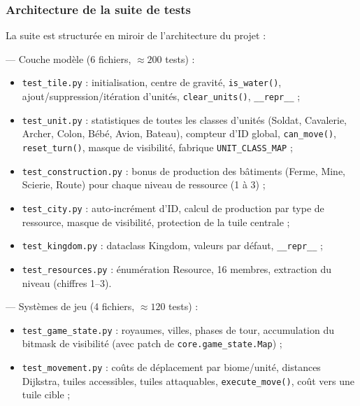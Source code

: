 \documentclass[12pt, a4paper]{article}
\begin{document}
\subsubsection{Architecture de la suite de tests}

La suite est structurée en miroir de l'architecture du projet :

\begin{description}[leftmargin=2em]
    \item[\texttt{test/world/}] — Couche modèle (6 fichiers, $\approx 200$ tests) :
    \begin{itemize}
        \item \texttt{test\_tile.py} : initialisation, centre de gravité, \texttt{is\_water()},
        ajout/suppression/itération d'unités, \texttt{clear\_units()}, \texttt{\_\_repr\_\_} ;
        \item \texttt{test\_unit.py} : statistiques de toutes les classes d'unités (Soldat,
        Cavalerie, Archer, Colon, Bébé, Avion, Bateau), compteur d'ID global,
        \texttt{can\_move()}, \texttt{reset\_turn()}, masque de visibilité, fabrique
        \texttt{UNIT\_CLASS\_MAP} ;
        \item \texttt{test\_construction.py} : bonus de production des bâtiments (Ferme, Mine,
        Scierie, Route) pour chaque niveau de ressource (1 à 3) ;
        \item \texttt{test\_city.py} : auto-incrément d'ID, calcul de production par type
        de ressource, masque de visibilité, protection de la tuile centrale ;
        \item \texttt{test\_kingdom.py} : dataclass Kingdom, valeurs par défaut, \texttt{\_\_repr\_\_} ;
        \item \texttt{test\_resources.py} : énumération Resource, 16 membres, extraction du
        niveau (chiffres 1–3).
    \end{itemize}
    \item[\texttt{test/core/}] — Systèmes de jeu (4 fichiers, $\approx 120$ tests) :
    \begin{itemize}
        \item \texttt{test\_game\_state.py} : royaumes, villes, phases de tour, accumulation
        du bitmask de visibilité (avec patch de \texttt{core.game\_state.Map}) ;
        \item \texttt{test\_movement.py} : coûts de déplacement par biome/unité, distances
        Dijkstra, tuiles accessibles, tuiles attaquables, \texttt{execute\_move()},
        coût vers une tuile cible ;

\end{itemize}
\end{description}
\end{document}
